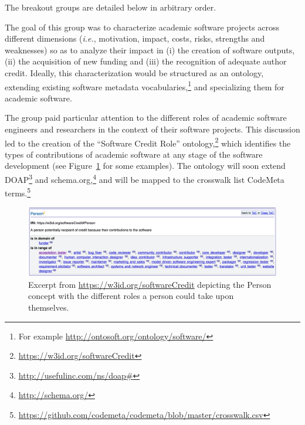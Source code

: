 \documentclass[a4paper,UKenglish]{dagrep}
\newcommand{\ie}{\emph{i.e.},\xspace}
\newcommand{\eg}{\emph{e.g.},\xspace}
\begin{document}
The breakout groups are detailed below in arbitrary order.


The goal of this group was to characterize academic software projects across different dimensions (\ie motivation, impact, costs, risks, strengths and weaknesses) so as to analyze their impact in (i) the creation of software outputs, (ii) the acquisition of new funding and (iii) the recognition of adequate author credit. Ideally, this characterization would be structured as an ontology, extending existing software metadata vocabularies,\footnote{For example \url{http://ontosoft.org/ontology/software/}} and specializing them for academic software.



The group paid particular attention to the different roles of academic software engineers and researchers in the context of their software projects. This discussion led to the creation of the ``Software Credit Role'' ontology,\footnote{\url{https://w3id.org/softwareCredit}} which identifies the types of contributions of academic software at any stage of the software development (see Figure~\ref{fig:credits} for some examples). The ontology will soon extend DOAP\footnote{\url{http://usefulinc.com/ns/doap\#}} and schema.org,\footnote{\url{http://schema.org/}} and will be mapped to the crosswalk list CodeMeta terms.\footnote{\url{https://github.com/codemeta/codemeta/blob/master/crosswalk.csv}}

\begin{figure}[t]
\includegraphics[width=\textwidth]{credits}
\caption{Excerpt from \url{https://w3id.org/softwareCredit} depicting the Person concept with the different roles a person could take upon themselves.\label{fig:credits}}
\end{figure}
\end{document}
